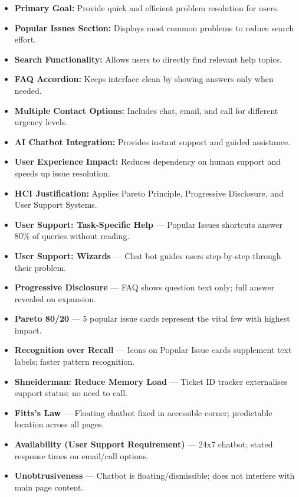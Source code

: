 \documentclass[11pt,a4paper]{article}
\newcommand{\ptag}[1]{\colorbox{tagbg}{\textcolor{tagtxt}{\textbf{\small #1}}}}
\begin{document}
\begin{itemize}[leftmargin=1.5em,itemsep=4pt]

\item \textbf{Primary Goal:}
Provide quick and efficient problem resolution for users.

\item \textbf{Popular Issues Section:}
Displays most common problems to reduce search effort.

\item \textbf{Search Functionality:}
Allows users to directly find relevant help topics.

\item \textbf{FAQ Accordion:}
Keeps interface clean by showing answers only when needed.

\item \textbf{Multiple Contact Options:}
Includes chat, email, and call for different urgency levels.

\item \textbf{AI Chatbot Integration:}
Provides instant support and guided assistance.

\item \textbf{User Experience Impact:}
Reduces dependency on human support and speeds up issue resolution.

\item \textbf{HCI Justification:}
Applies Pareto Principle, Progressive Disclosure, and User Support Systems.

\end{itemize}
\begin{hcimap}
\begin{itemize}[leftmargin=1.2em,itemsep=2pt]
  \item \ptag{User Support: Task-Specific Help} --- Popular Issues shortcuts answer 80\% of queries without reading.
  \item \ptag{User Support: Wizards} --- Chat bot guides users step-by-step through their problem.
  \item \ptag{Progressive Disclosure} --- FAQ shows question text only; full answer revealed on expansion.
  \item \ptag{Pareto 80/20} --- 5 popular issue cards represent the vital few with highest impact.
  \item \ptag{Recognition over Recall} --- Icons on Popular Issue cards supplement text labels; faster pattern recognition.
  \item \ptag{Shneiderman: Reduce Memory Load} --- Ticket ID tracker externalises support status; no need to call.
  \item \ptag{Fitts's Law} --- Floating chatbot fixed in accessible corner; predictable location across all pages.
  \item \ptag{Availability (User Support Requirement)} --- 24x7 chatbot; stated response times on email/call options.
  \item \ptag{Unobtrusiveness} --- Chatbot is floating/dismissible; does not interfere with main page content.
\end{itemize}
\end{hcimap}
\end{document}
